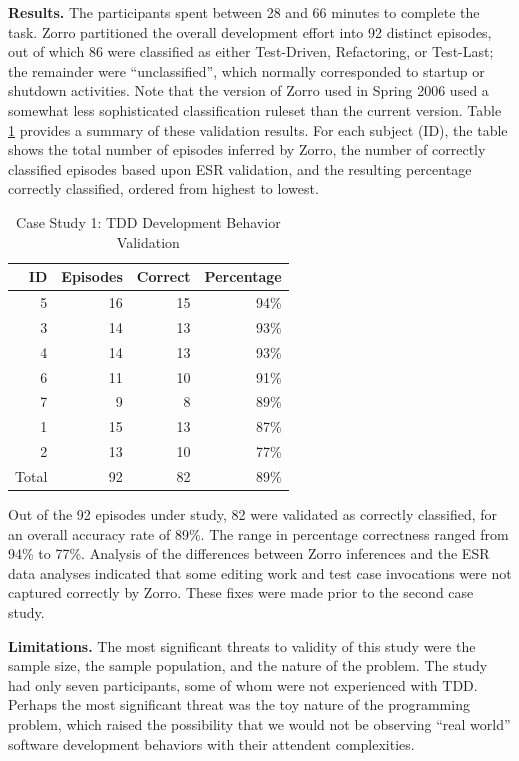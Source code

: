 \documentclass[smallextended]{svjour3}     %
\begin{document}
{\bf Results.}  The participants spent between 28 and 66 minutes to
complete the task.  Zorro partitioned the overall development effort into
92 distinct episodes, out of which 86 were classified as either
Test-Driven, Refactoring, or Test-Last; the remainder were
``unclassified'', which normally corresponded to startup or shutdown
activities.  Note that the version of Zorro used in Spring 2006 used a
somewhat less sophisticated classification ruleset than the current
version. Table \ref{tab:EsrPilotStudy} provides a summary of these
validation results. For each subject (ID), the table shows the total number
of episodes inferred by Zorro, the number of correctly classified episodes
based upon ESR validation, and the resulting percentage correctly
classified, ordered from highest to lowest.

\begin{table}[ht]
\centering
  \caption{Case Study 1: TDD Development Behavior Validation}
  \begin{tabular}{|r|r|r|r|}
  \hline
    ID & Episodes & Correct & Percentage \\ \hline
    5  & 16 &  15 & 94\% \\ \hline
    3  & 14 &  13 & 93\% \\ \hline
    4  & 14 &  13 & 93\% \\ \hline
    6  & 11 &  10 & 91\% \\ \hline
    7  &  9 &  8  & 89\% \\ \hline
    1  & 15 &  13 & 87\% \\ \hline
    2  & 13 &  10 & 77\% \\ \hline \hline
Total  & 92 & 82  & 89\% \\ 
  \hline
  \end{tabular}
  \label{tab:EsrPilotStudy}  
\end{table}

Out of the 92 episodes under study, 82 were validated as correctly
classified, for an overall accuracy rate of 89\%.  The range in percentage
correctness ranged from 94\% to 77\%.  Analysis of the differences between
Zorro inferences and the ESR data analyses indicated that some editing work
and test case invocations were not captured correctly by Zorro.  These
fixes were made prior to the second case study.

{\bf Limitations.}  The most significant threats to validity of this study
were the sample size, the sample population, and the nature of the problem.
The study had only seven participants, some of whom were not experienced
with TDD.  Perhaps the most significant threat was the toy nature of the
programming problem, which raised the possibility that we would not be
observing ``real world'' software development behaviors with their
attendent complexities.
\end{document}
